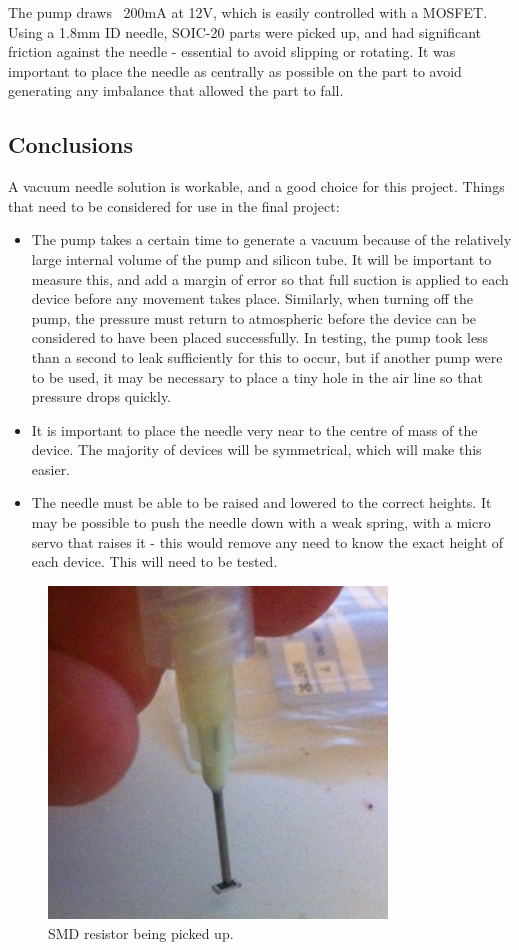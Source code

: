 The pump draws ~200mA at 12V, which is easily controlled with a MOSFET. Using a 1.8mm ID needle, SOIC-20 parts were picked up, 
and had significant friction against the needle - essential to avoid slipping or rotating. It was important to place the needle 
as centrally as possible on the part to avoid generating any imbalance that allowed the part to fall. 

\subsection{Conclusions}
A vacuum needle solution is workable, and a good choice for this project. Things that need to be considered for use in the final project:

\begin{itemize}
	\item	The pump takes a certain time to generate a vacuum because of the relatively large internal volume of the pump
		and silicon tube. It will be important to measure this, and add a margin of error so that full suction is applied
		to each device before any movement takes place. Similarly, when turning off the pump, the pressure must return to
		atmospheric before the device can be considered to have been placed successfully. In testing, the pump took
		less than a second to leak sufficiently for this to occur, but if another pump were to be used, it may be necessary
		to place a tiny hole in the air line so that pressure drops quickly.
	\item	It is important to place the needle very near to the centre of mass of the device. The majority of devices will be
		symmetrical, which will make this easier.
	\item	The needle must be able to be raised and lowered to the correct heights. It may be possible to push the needle down
		with a weak spring, with a micro servo that raises it - this would remove any need to know the exact height of each
		device. This will need to be tested.
\end{itemize}

\begin{figure}[ht!]
\centering
\includegraphics[width=90mm]{resources/needle_with_resistor.jpg}
\caption{SMD resistor being picked up.}
\label{overflow}
\end{figure}


